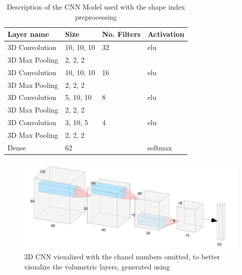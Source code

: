\documentclass[12pt]{article}
\theoremstyle{definition}
\begin{document}
	\begin{table}[h]
		\centering
		\renewcommand{\arraystretch}{1.35}

		\caption{Description of the CNN Model used with the shape index preprocessing}
		\label{table:preprocessing-CNN}

		\begin{tabularx}{\textwidth}{XXXX}
			\textbf{Layer name} & \textbf{Size} & \textbf{No. Filters} & \textbf{Activation} \\ \hline
			3D Convolution & 10, 10, 10 & 32                   & elu                  \\ \hline
			3D Max Pooling & 2, 2, 2    & \textbf{\textendash} & \textbf{\textendash} \\ \hline
			3D Convolution & 10, 10, 10 & 16                   & elu                  \\ \hline
			3D Max Pooling & 2, 2, 2    & \textbf{\textendash} & \textbf{\textendash} \\ \hline
			3D Convolution & 5, 10, 10  & 8                    & elu                  \\ \hline
			3D Max Pooling & 2, 2, 2    & \textbf{\textendash} & \textbf{\textendash} \\ \hline
			3D Convolution & 3, 10, 5   & 4                    & elu                  \\ \hline
			3D Max Pooling & 2, 2, 2    & \textbf{\textendash} & \textbf{\textendash} \\ \hline
			Dense       & 62         & \textbf{\textendash} & softmax              \\
		\end{tabularx}
	\end{table}

	\begin{figure}
		\includegraphics[width=\textwidth]{networks/3D-CNN.png}
		\caption{3D CNN visualized with the chanel numbers omitted, to better visualize the volumetric layers, generated using \cite{nn-svg}}
		\label{figure:3D-CNN}
	\end{figure}
\end{document}
